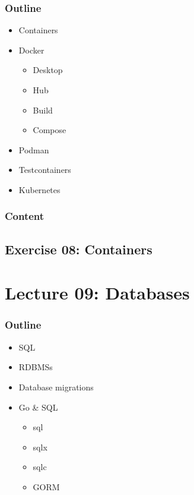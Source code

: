 \documentclass[
  digital,
  color,
  oneside,
  nosansbold,
  nocolorbold,
  lof,
  lot,
]{fithesis4}
\begin{document}
\subsubsection{Outline}

\begin{itemize}
    \item Containers
    \item Docker
    \begin{itemize}
        \item Desktop
        \item Hub
        \item Build
        \item Compose
    \end{itemize}
    \item Podman
    \item Testcontainers
    \item Kubernetes
\end{itemize}

\subsubsection{Content}

\subsection{Exercise 08: Containers}

\section{Lecture 09: Databases}

\subsubsection{Outline}

\begin{itemize}
    \item SQL
    \item RDBMSs
    \item Database migrations
    \item Go \& SQL
    \begin{itemize}
        \item sql
        \item sqlx
        \item sqlc
        \item GORM
    \end{itemize}
\end{itemize}
\end{document}
